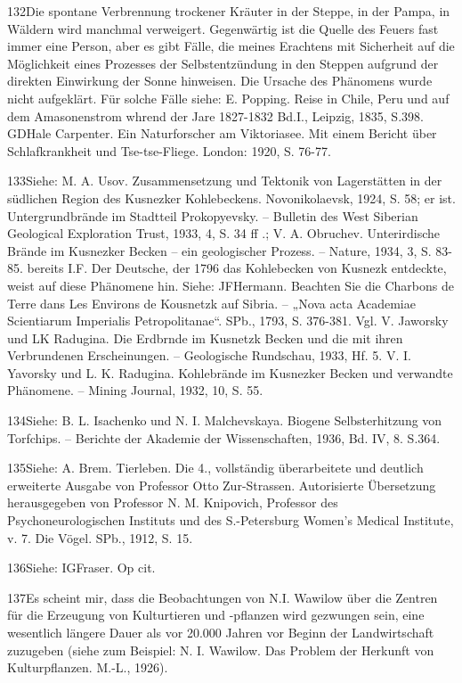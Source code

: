 \documentclass[11pt,a4paper]{book}
\begin{document}
132Die spontane Verbrennung trockener Kräuter in der Steppe, in der Pampa, in Wäldern wird manchmal verweigert. Gegenwärtig ist die Quelle des Feuers fast immer eine Person, aber es gibt Fälle, die meines Erachtens mit Sicherheit auf die Möglichkeit eines Prozesses der Selbstentzündung in den Steppen aufgrund der direkten Einwirkung der Sonne hinweisen. Die Ursache des Phänomens wurde nicht aufgeklärt. Für solche Fälle siehe: E. Popping. Reise in Chile, Peru und auf dem Amasonenstrom whrend der Jare 1827-1832 Bd.I., Leipzig, 1835, S.398. GDHale Carpenter. Ein Naturforscher am Viktoriasee. Mit einem Bericht über Schlafkrankheit und Tse-tse-Fliege. London: 1920, S. 76-77.



133Siehe: M. A. Usov. Zusammensetzung und Tektonik von Lagerstätten in der südlichen Region des Kusnezker Kohlebeckens. Novonikolaevsk, 1924, S. 58; er ist. Untergrundbrände im Stadtteil Prokopyevsky. -- Bulletin des West Siberian Geological Exploration Trust, 1933, 4, S. 34 ff .; V. A. Obruchev. Unterirdische Brände im Kusnezker Becken -- ein geologischer Prozess. -- Nature, 1934, 3, S. 83-85. bereits I.F. Der Deutsche, der 1796 das Kohlebecken von Kusnezk entdeckte, weist auf diese Phänomene hin. Siehe: JFHermann. Beachten Sie die Charbons de Terre dans Les Environs de Kousnetzk auf Sibria. -- „Nova acta Academiae Scientiarum Imperialis Petropolitanae“. SPb., 1793, S. 376-381. Vgl. V. Jaworsky und LK Radugina. Die Erdbrnde im Kusnetzk Becken und die mit ihren Verbrundenen Erscheinungen. -- Geologische Rundschau, 1933, Hf. 5. V. I. Yavorsky und L. K. Radugina. Kohlebrände im Kusnezker Becken und verwandte Phänomene. -- Mining Journal, 1932, 10, S. 55.



134Siehe: B. L. Isachenko und N. I. Malchevskaya. Biogene Selbsterhitzung von Torfchips. -- Berichte der Akademie der Wissenschaften, 1936, Bd. IV, 8. S.364.



135Siehe: A. Brem. Tierleben. Die 4., vollständig überarbeitete und deutlich erweiterte Ausgabe von Professor Otto Zur-Strassen. Autorisierte Übersetzung herausgegeben von Professor N. M. Knipovich, Professor des Psychoneurologischen Instituts und des S.-Petersburg Women's Medical Institute, v. 7. Die Vögel. SPb., 1912, S. 15.



136Siehe: IGFraser. Op cit.



137Es scheint mir, dass die Beobachtungen von N.I. Wawilow über die Zentren für die Erzeugung von Kulturtieren und -pflanzen wird gezwungen sein, eine wesentlich längere Dauer als vor 20.000 Jahren vor Beginn der Landwirtschaft zuzugeben (siehe zum Beispiel: N. I. Wawilow. Das Problem der Herkunft von Kulturpflanzen. M.-L., 1926).
\end{document}
